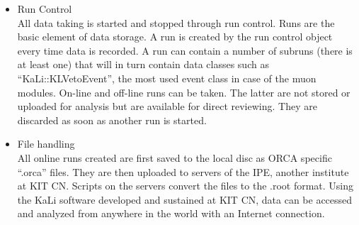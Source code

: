 \begin{itemize}
	\item Run Control\\
	All data taking is started and stopped through run control. Runs are the basic element of data storage. A run is created by the run control object every time data is recorded. A run can contain a number of subruns (there is at least one) that will in turn contain data classes such as ``KaLi::KLVetoEvent'', the most used event class in case of the muon modules. On-line and off-line runs can be taken. The latter are not stored or uploaded for analysis but are available for direct reviewing. They are discarded as soon as another run is started.
	\item File handling\\
    All online runs created are first saved to the local disc as ORCA specific ``.orca'' files. They are then uploaded to servers of the IPE, another institute at KIT CN. Scripts on the servers convert the files to the .root format. Using the KaLi software developed and sustained at KIT CN, data can be accessed and analyzed from anywhere in the world with an Internet connection.


\end{itemize}
